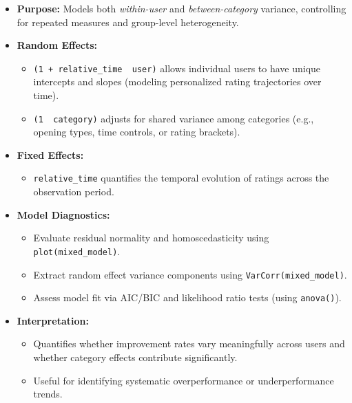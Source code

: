 \documentclass[
]{article}
\providecommand{\tightlist}{%
  \setlength{\itemsep}{0pt}\setlength{\parskip}{0pt}}
\begin{document}
\begin{itemize}
\item
  \textbf{Purpose:} Models both \emph{within-user} and
  \emph{between-category} variance, controlling for repeated measures
  and group-level heterogeneity.
\item
  \textbf{Random Effects:}

  \begin{itemize}
  \tightlist
  \item
    \texttt{(1\ +\ relative\_time\ \textbar{}\ user)} allows individual
    users to have unique intercepts and slopes (modeling personalized
    rating trajectories over time).
  \item
    \texttt{(1\ \textbar{}\ category)} adjusts for shared variance among
    categories (e.g., opening types, time controls, or rating brackets).
  \end{itemize}
\item
  \textbf{Fixed Effects:}

  \begin{itemize}
  \tightlist
  \item
    \texttt{relative\_time} quantifies the temporal evolution of ratings
    across the observation period.
  \end{itemize}
\item
  \textbf{Model Diagnostics:}

  \begin{itemize}
  \tightlist
  \item
    Evaluate residual normality and homoscedasticity using
    \texttt{plot(mixed\_model)}.
  \item
    Extract random effect variance components using
    \texttt{VarCorr(mixed\_model)}.
  \item
    Assess model fit via AIC/BIC and likelihood ratio tests (using
    \texttt{anova()}).
  \end{itemize}
\item
  \textbf{Interpretation:}

  \begin{itemize}
  \tightlist
  \item
    Quantifies whether improvement rates vary meaningfully across users
    and whether category effects contribute significantly.
  \item
    Useful for identifying systematic overperformance or
    underperformance trends.
  \end{itemize}
\end{itemize}
\end{document}
